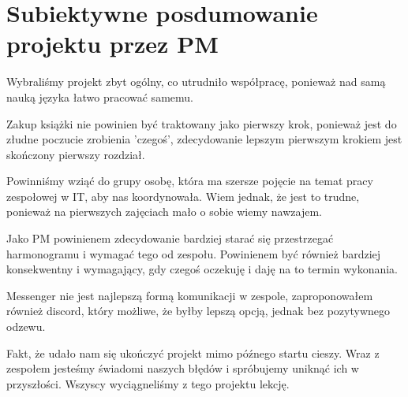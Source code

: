 \documentclass{article}
\begin{document}
\newpage
\section{Subiektywne posdumowanie projektu przez PM}
Wybraliśmy projekt zbyt ogólny, co utrudniło współpracę, ponieważ nad samą nauką języka łatwo pracować samemu.
\par Zakup książki nie powinien być traktowany jako pierwszy krok, ponieważ jest do złudne poczucie zrobienia 'czegoś', zdecydowanie lepszym pierwszym krokiem jest skończony pierwszy rozdział. \par Powinniśmy wziąć do grupy osobę, która ma szersze pojęcie na temat pracy zespołowej w IT, aby nas koordynowała. Wiem jednak, że jest to trudne, ponieważ na pierwszych zajęciach mało o sobie wiemy nawzajem.
\par Jako PM powinienem zdecydowanie bardziej starać się przestrzegać harmonogramu i wymagać tego od zespołu. Powinienem być również bardziej konsekwentny i wymagający, gdy czegoś oczekuję i daję na to termin wykonania. \par Messenger nie jest najlepszą formą komunikacji w zespole, zaproponowałem również discord, który możliwe, że byłby lepszą opcją, jednak bez pozytywnego odzewu.\par Fakt, że udało nam się ukończyć projekt mimo późnego startu cieszy. Wraz z zespołem jesteśmy świadomi naszych błędów i spróbujemy uniknąć ich w przyszłości. Wszyscy wyciągneliśmy z tego projektu lekcję.
\end{document}
